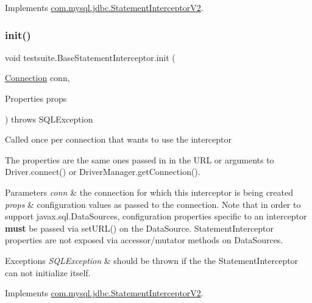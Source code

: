 Implements \mbox{\hyperlink{interfacecom_1_1mysql_1_1jdbc_1_1_statement_interceptor_v2_a36f03c5f5b1755d48549862d5b6c627f}{com.\+mysql.\+jdbc.\+Statement\+Interceptor\+V2}}.

\mbox{\label{classtestsuite_1_1_base_statement_interceptor_a9f780bb34bc2101037455ca81d1c2a16}} 
\subsubsection{\texorpdfstring{init()}{init()}}
{\footnotesize\ttfamily void testsuite.\+Base\+Statement\+Interceptor.\+init (\begin{DoxyParamCaption}\item[{\mbox{\hyperlink{interfacecom_1_1mysql_1_1jdbc_1_1_connection}{Connection}}}]{conn,  }\item[{Properties}]{props }\end{DoxyParamCaption}) throws S\+Q\+L\+Exception}

Called once per connection that wants to use the interceptor

The properties are the same ones passed in in the U\+RL or arguments to Driver.\+connect() or Driver\+Manager.\+get\+Connection().


\begin{DoxyParams}{Parameters}
{\em conn} & the connection for which this interceptor is being created \\
\hline
{\em props} & configuration values as passed to the connection. Note that in order to support javax.\+sql.\+Data\+Sources, configuration properties specific to an interceptor {\bfseries must} be passed via set\+U\+R\+L() on the Data\+Source. Statement\+Interceptor properties are not exposed via accessor/mutator methods on Data\+Sources.\\
\hline
\end{DoxyParams}

\begin{DoxyExceptions}{Exceptions}
{\em S\+Q\+L\+Exception} & should be thrown if the the Statement\+Interceptor can not initialize itself. \\
\hline
\end{DoxyExceptions}


Implements \mbox{\hyperlink{interfacecom_1_1mysql_1_1jdbc_1_1_statement_interceptor_v2_ae2d3d924826dcf4a4e025433af0b4d8f}{com.\+mysql.\+jdbc.\+Statement\+Interceptor\+V2}}.

